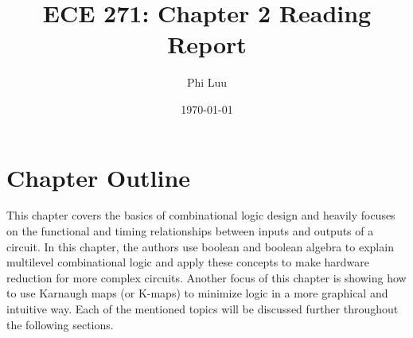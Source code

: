 \documentclass[12pt]{article}
\title{ECE 271: Chapter 2 Reading Report}
\author{Phi Luu}
\date{\today}
\begin{document}
\maketitle

\section{Chapter Outline}

This chapter covers the basics of combinational logic design and heavily focuses on the functional and timing relationships between inputs and outputs of a circuit. In this chapter, the authors use boolean and boolean algebra to explain multilevel combinational logic and apply these concepts to make hardware reduction for more complex circuits. Another focus of this chapter is showing how to use Karnaugh maps (or K-maps) to minimize logic in a more graphical and intuitive way. Each of the mentioned topics will be discussed further throughout the following sections.
\end{document}
